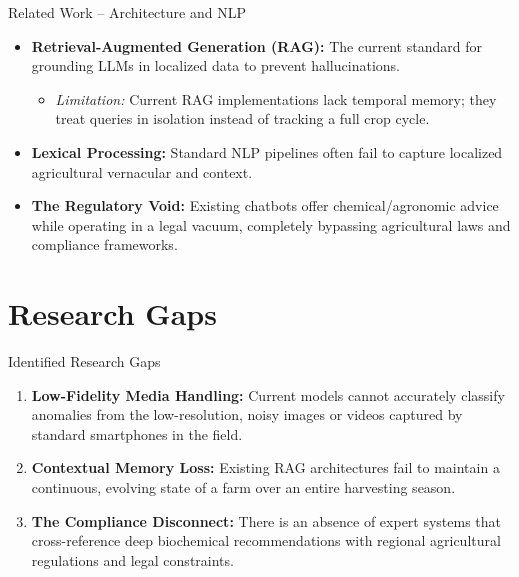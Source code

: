\documentclass{beamer}
\begin{document}
\begin{frame}{Related Work -- Architecture and NLP}
	\footnotesize
	\begin{itemize}
		\item \textbf{Retrieval-Augmented Generation (RAG):} The current standard for grounding LLMs in localized data to prevent hallucinations.
		\begin{itemize}
			\item \textit{Limitation:} Current RAG implementations lack temporal memory; they treat queries in isolation instead of tracking a full crop cycle.
		\end{itemize}
		
		\vspace{0.2cm}
		\item \textbf{Lexical Processing:} Standard NLP pipelines often fail to capture localized agricultural vernacular and context. 
		
		\vspace{0.2cm}
		\item \textbf{The Regulatory Void:} Existing chatbots offer chemical/agronomic advice while operating in a legal vacuum, completely bypassing agricultural laws and compliance frameworks.
	\end{itemize}
\end{frame}


\section{Research Gaps}
\begin{frame}{Identified Research Gaps}

	\footnotesize
	\begin{enumerate}
		\item \textbf{Low-Fidelity Media Handling:} Current models cannot accurately classify anomalies from the low-resolution, noisy images or videos captured by standard smartphones in the field.
		
		\vspace{0.2cm}
		\item \textbf{Contextual Memory Loss:} Existing RAG architectures fail to maintain a continuous, evolving state of a farm over an entire harvesting season.
		
		\vspace{0.2cm}
		\item \textbf{The Compliance Disconnect:} There is an absence of expert systems that cross-reference deep biochemical recommendations with regional agricultural regulations and legal constraints.
	\end{enumerate}
\end{frame}
\end{document}
